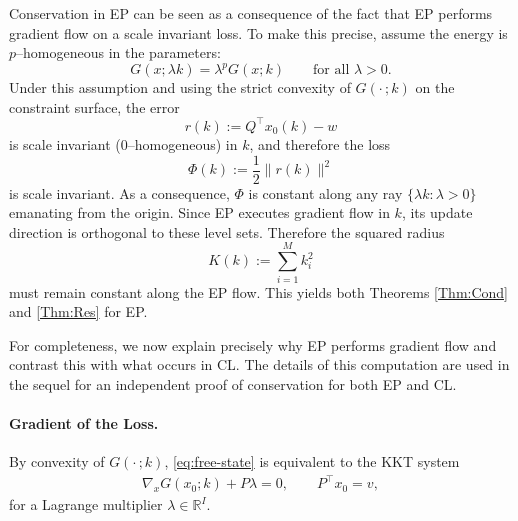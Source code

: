 \documentclass[final, 11pt, nonatbib]{elsarticle}
\theoremstyle{definition}
\theoremstyle{plain}
\numberwithin{equation}{section}
\begin{document}
Conservation in EP can be seen as a consequence of the fact that EP performs
gradient flow on a scale invariant loss. To make this precise, assume the energy is
$p$–homogeneous in the parameters:
\[
    G(x;\lambda k) = \lambda^{p} G(x;k)
    \qquad \text{for all } \lambda>0.
\]
Under this assumption and using the strict convexity of $G(\cdot \, ;k)$ on the constraint surface, the error 
\[ r(k) := Q^\top x_0(k) - w \] 
is scale invariant ($0$–homogeneous) in $k$, and therefore the loss
\[
    \Phi(k) := \frac{1}{2}\|r(k)\|^{2}
\]
is scale invariant. As a consequence, $\Phi$ is constant along any ray
$\{\lambda k : \lambda>0\}$ emanating from the origin.  Since EP executes
gradient flow in $k$, its update direction is orthogonal to these level sets.
Therefore the squared radius
\[
    K(k) := \sum_{i=1}^{M} k_i^{2}
\]
must remain constant along the EP flow.  This yields both Theorems
\ref{Thm:Cond} and \ref{Thm:Res} for EP.

For completeness, we now explain precisely why EP performs gradient flow and
contrast this with what occurs in CL. The details of this computation are
used in the sequel for an independent proof of conservation for both EP and CL. 

\paragraph{Gradient of the Loss.}
By convexity of $G(\cdot \,;k)$, \eqref{eq:free-state} is equivalent to the KKT system
\begin{align}
\nabla_x G(x_0; k) + P\lambda = 0,\qquad P^\top x_0 = v, \label{eq:kkt}
\end{align}
for a Lagrange multiplier $\lambda\in\mathbb{R}^I$.
\end{document}
